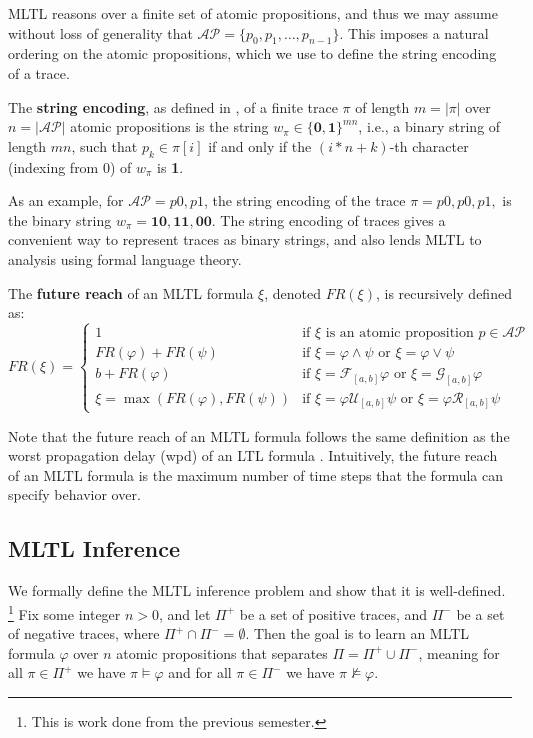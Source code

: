 \documentclass[runningheads]{llncs}
\renewcommand{\phi}{\varphi}
\begin{document}
MLTL reasons over a finite set of atomic propositions, and thus we may assume without loss of generality that $\mathcal{AP} = \{p_0, p_1, \ldots, p_{n-1}\}$.
This imposes a natural ordering on the atomic propositions, which we use to define the string encoding of a trace.
\vspace{-10pt}
\begin{definition}
    The \textbf{string encoding}, as defined in \cite{WEST_tool}, of a finite trace $\pi$ of length $m = |\pi|$ over $n = |\mathcal{AP}|$ atomic propositions is the string $w_{\pi} \in \{\textbf{0}, \textbf{1}\}^{mn}$, i.e., a binary string of length $mn$, such that $p_k \in \pi[i]$ if and only if 
    the $(i*n + k)$-th character (indexing from 0) %
    of $w_{\pi}$ is \textbf{1}.
\end{definition}

As an example, for $\mathcal{AP} = {p0, p1}$, the string encoding of the trace $\pi = {p0}, {p0, p1}, {}$ is the binary string $w_\pi = \textbf{10}, \textbf{11}, \textbf{00}$.
The string encoding of traces gives a convenient way to represent traces as binary strings, and also lends MLTL to analysis using formal language theory. 
\begin{definition}
    The \textbf{future reach} of an MLTL formula $\xi$, denoted $FR(\xi)$, is recursively defined as:
    $$
    FR(\xi) = 
    \begin{cases}
        1 & \text{if } \xi \text{ is an atomic proposition } p \in \mathcal{AP}\\
        FR(\phi) + FR(\psi) & \text{if } \xi = \phi \land \psi \text{ or } \xi = \phi \lor \psi\\
        b + FR(\phi) & \text{if } \xi = \mathcal{F}_{[a,b]}\phi \text{ or } \xi = \mathcal{G}_{[a,b]}\phi\\
        \xi = \max(FR(\phi), FR(\psi)) & \text{if } \xi = \phi \mathcal{U}_{[a,b]} \psi \text{ or } \xi = \phi \mathcal{R}_{[a,b]} \psi
    \end{cases}
    $$
\end{definition}

Note that the future reach of an MLTL formula follows the same definition as the worst propagation delay (wpd) of an LTL formula \cite{KZJZR20}. 
Intuitively, the future reach of an MLTL formula is the maximum number of time steps that the formula can specify behavior over.

\subsection{MLTL Inference}
We formally define the MLTL inference problem and show that it is well-defined.
\footnote{This is work done from the previous semester.}
Fix some integer $n > 0$, and let $\Pi^+$ be a set of positive traces, and $\Pi^-$ be a set of negative traces, where $\Pi^+ \cap \Pi^- = \emptyset$. 
Then the goal is to learn an MLTL formula $\phi$ over $n$ atomic propositions that separates $\Pi = \Pi^+ \cup \Pi^-$, meaning for all $\pi \in \Pi^+$ we have $\pi \vDash \phi$ and for all $\pi \in \Pi^-$ we have $\pi \nvDash \phi$.
\end{document}
